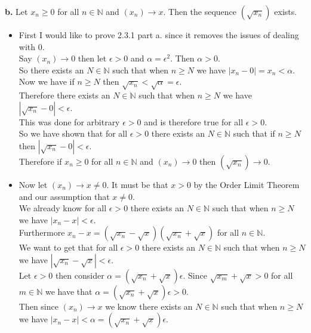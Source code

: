 \documentclass{article}
\begin{document}
{\Large \textbf{b.}} Let $x_n\geq 0$ for all $n\in\mathbb{N}$ and $(x_n)\rightarrow x$. Then the sequence $(\sqrt{x_n})$ exists.
\begin{center}
    \doublespacing
    \begin{itemize}
        \item First I would like to prove 2.3.1 part a. since it removes the issues of dealing with 0.
        \\Say $(x_n)\rightarrow 0$ then let $\epsilon > 0$ and $\alpha = \epsilon ^2$. Then $\alpha > 0$.
        \\So there exists an $N\in\mathbb{N}$ such that when $n\geq N$ we have $|x_n - 0| = x_n <\alpha$.
        \\Now we have if $n\geq N$ then $\sqrt{x_n} <\sqrt{\alpha} =\epsilon$.
        \\Therefore there exists an $N\in\mathbb{N}$ such that when $n\geq N$ we have $|\sqrt{x_n} - 0| <\epsilon$.
        \\This was done for arbitrary $\epsilon > 0$ and is therefore true for all $\epsilon > 0$.
        \\So we have shown that for all $\epsilon > 0$ there exists an $N\in\mathbb{N}$ such that if $n\geq N$ then $|\sqrt{x_n} - 0| <\epsilon$.
        \\Therefore if $x_n\geq 0$ for all $n\in\mathbb{N}$ and $(x_n)\rightarrow 0$ then $(\sqrt{x_n})\rightarrow 0$.
        \item Now let $(x_n)\rightarrow x\neq 0$. It must be that $x > 0$ by the Order Limit Theorem and our assumption that $x\neq 0$.
        \\We already know for all $\epsilon > 0$ there exists an $N\in\mathbb{N}$ such that when $n\geq N$ we have $|x_n - x| <\epsilon$.
        \\Furthermore $x_n - x = (\sqrt{x_n} -\sqrt{x})(\sqrt{x_n} +\sqrt{x})$ for all $n\in\mathbb{N}$.
        \\We want to get that for all $\epsilon > 0$ there exists an $N\in\mathbb{N}$ such that when $n\geq N$ we have $|\sqrt{x_n} -\sqrt{x}| <\epsilon$.
        \\Let $\epsilon > 0$ then consider $\alpha = (\sqrt{x_n} +\sqrt{x})\epsilon$. Since $\sqrt{x_m} +\sqrt{x} > 0$ for all $m\in\mathbb{N}$ we have that $\alpha = (\sqrt{x_n} +\sqrt{x})\epsilon > 0$.
        \\Then since $(x_n)\rightarrow x$ we know there exists an $N\in\mathbb{N}$ such that when $n\geq N$ we have $|x_n - x| <\alpha = (\sqrt{x_n} +\sqrt{x})\epsilon$.

\end{itemize}
\end{center}
\end{document}
